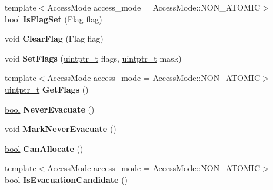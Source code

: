 \begin{DoxyCompactItemize}
\item 
\mbox{\label{classv8_1_1internal_1_1MemoryChunk_a85b109b8c4a021c7863004435fa2756f}} 
{\footnotesize template$<$Access\+Mode access\+\_\+mode = Access\+Mode\+::\+N\+O\+N\+\_\+\+A\+T\+O\+M\+IC$>$ }\\\mbox{\hyperlink{classbool}{bool}} {\bfseries Is\+Flag\+Set} (Flag flag)
\item 
\mbox{\label{classv8_1_1internal_1_1MemoryChunk_a5468e5ca4beda91b6488f1bbcb5eb112}} 
void {\bfseries Clear\+Flag} (Flag flag)
\item 
\mbox{\label{classv8_1_1internal_1_1MemoryChunk_a1a2a716509aafdfa6dbfba14d63c15d6}} 
void {\bfseries Set\+Flags} (\mbox{\hyperlink{classuintptr__t}{uintptr\+\_\+t}} flags, \mbox{\hyperlink{classuintptr__t}{uintptr\+\_\+t}} mask)
\item 
\mbox{\label{classv8_1_1internal_1_1MemoryChunk_a21aa613e408c5c90024c91586c429685}} 
{\footnotesize template$<$Access\+Mode access\+\_\+mode = Access\+Mode\+::\+N\+O\+N\+\_\+\+A\+T\+O\+M\+IC$>$ }\\\mbox{\hyperlink{classuintptr__t}{uintptr\+\_\+t}} {\bfseries Get\+Flags} ()
\item 
\mbox{\label{classv8_1_1internal_1_1MemoryChunk_adb32669679a246e5bd54404de55a3429}} 
\mbox{\hyperlink{classbool}{bool}} {\bfseries Never\+Evacuate} ()
\item 
\mbox{\label{classv8_1_1internal_1_1MemoryChunk_a67bb1a9d9c61a11bc804df209743ebc0}} 
void {\bfseries Mark\+Never\+Evacuate} ()
\item 
\mbox{\label{classv8_1_1internal_1_1MemoryChunk_a343f2c71ac0ced1674caf06885978bd2}} 
\mbox{\hyperlink{classbool}{bool}} {\bfseries Can\+Allocate} ()
\item 
\mbox{\label{classv8_1_1internal_1_1MemoryChunk_a42047e8f802a481f4b9db16efb8edd05}} 
{\footnotesize template$<$Access\+Mode access\+\_\+mode = Access\+Mode\+::\+N\+O\+N\+\_\+\+A\+T\+O\+M\+IC$>$ }\\\mbox{\hyperlink{classbool}{bool}} {\bfseries Is\+Evacuation\+Candidate} ()

\end{DoxyCompactItemize}
